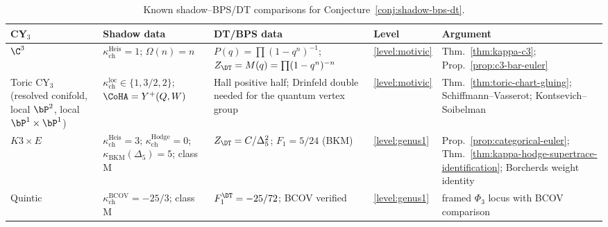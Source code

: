 \begin{table}[ht]
\caption{Known shadow--BPS/DT comparisons for Conjecture~\textup{\ref{conj:shadow-bps-dt}}.}
\label{tab:shadow-bps-evidence}
\centering
\renewcommand{\arraystretch}{1.4}
\small
\begin{tabular}{lp{3.2cm}p{4.5cm}lp{2.5cm}}
 \toprule
 \textbf{CY$_3$} & \textbf{Shadow data} & \textbf{DT/BPS data} & \textbf{Level} & \textbf{Argument} \\
 \midrule
 $\C^3$ &
 $\kappa_{\mathrm{ch}}^{\mathrm{Heis}} = 1$; $\Omega(n) = n$ &
 $P(q)=\prod(1-q^n)^{-1}$; $Z_{\DT} = M(q) = \prod(1-q^n)^{-n}$ &
 \ref{level:motivic} &
 Thm.~\ref{thm:kappa-c3}; Prop.~\ref{prop:c3-bar-euler} \\
 \addlinespace
 Toric CY$_3$ (resolved conifold, local $\bP^2$, local $\bP^1 \times \bP^1$) &
 $\kappa_{\mathrm{ch}}^{\mathrm{loc}} \in \{1, 3/2, 2\}$; $\CoHA = Y^+(Q,W)$ &
 Hall positive half; Drinfeld double needed for the quantum vertex group &
 \ref{level:motivic} &
 Thm.~\ref{thm:toric-chart-gluing}; Schiffmann--Vasserot; Kontsevich--Soibelman \\
 \addlinespace
$K3 \times E$ &
 $\kappa_{\mathrm{ch}}^{\mathrm{Heis}} = 3$; $\kappa_{\mathrm{ch}}^{\mathrm{Hodge}} = 0$; $\kappa_{\mathrm{BKM}}(\Delta_5) = 5$; class M &
 $Z_{\DT} = C/\Delta_5^2$; $F_1 = 5/24$ (BKM) &
 \ref{level:genus1} &
 Prop.~\ref{prop:categorical-euler}; Thm.~\ref{thm:kappa-hodge-supertrace-identification}; Borcherds weight identity \\
 \addlinespace
Quintic &
 $\kappa_{\mathrm{ch}}^{\mathrm{BCOV}} = -25/3$; class M &
 $F_1^{\DT} = -25/72$; BCOV verified &
 \ref{level:genus1} &
 framed $\Phi_3$ locus with BCOV comparison \\
 \bottomrule
\end{tabular}
\end{table}

